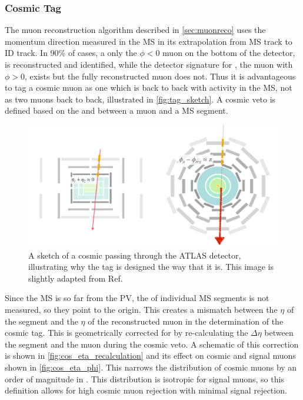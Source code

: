 \subsubsection{Cosmic Tag}
\label{sec:cosmictag}
The muon reconstruction algorithm described in \autoref{sec:muonreco} uses the momentum direction measured in the \ac{MS} in its extrapolation from \ac{MS} track to \ac{ID} track. In 90\% of cases, a only the  $\phi < 0$ muon on the bottom of the detector, \mb is reconstructed and identified, while the detector signature for \mt, the muon with $\phi > 0$, exists but the fully reconstructed muon does not. Thus it is advantageous to tag a cosmic muon as one which is back to back with activity in the \ac{MS}, not as two muons back to back, illustrated in \autoref{fig:tag_sketch}. A cosmic veto is defined based on the \dphicos and \sigeta between a muon and a \ac{MS} segment. 

\begin{figure}[htbp]
\centering
\includegraphics[width=.8\textwidth]{figures/cosmics/tag_sketch.png}
\caption{A sketch of a cosmic passing through the ATLAS detector, illustrating why the tag is designed the way that it is. This image is slightly adapted from Ref.~\cite{ATLAS-CONF-2019-006}}
\label{fig:tag_sketch}
\end{figure}

Since the \ac{MS} is so far from the \ac{PV}, the \z of individual MS segments is not measured, so they point to the origin. This creates a mismatch between the $\eta$ of the segment and the $\eta$ of the reconstructed muon in the determination of the cosmic tag. This is geometrically corrected for by re-calculating the $\Delta\eta$ between the segment and the muon during the cosmic veto. A schematic of this correction is shown in \autoref{fig:cos_eta_recalculation} and its effect on cosmic and signal muons shown in \autoref{fig:cos_eta_phi}. This narrows the distribution of cosmic muons by an order of magnitude in \sigeta. This distribution is isotropic for signal muons, so this definition allows for high cosmic muon rejection with minimal signal rejection. 

